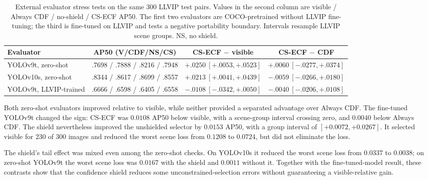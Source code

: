 \documentclass[preprint,11pt]{elsarticle}
\begin{document}
\begin{table}[t]
\centering
\scriptsize
\setlength{\tabcolsep}{3pt}
\caption{External evaluator stress tests on the same 300 LLVIP test pairs.
Values in the second column are visible / Always CDF / no-shield / CS-ECF AP50.
The first two evaluators are COCO-pretrained without LLVIP fine-tuning; the
third is fine-tuned on LLVIP and tests a negative portability boundary.
Intervals resample LLVIP scene groups. NS, no shield.}
\label{tab:independent}
\begin{tabular}{@{}lccc@{}}
\toprule
Evaluator & AP50 (V/CDF/NS/CS) &
CS-ECF \(-\) visible & CS-ECF \(-\) CDF \\
\midrule
YOLOv9t, zero-shot & .7698 / .7888 / .8216 / .7948 &
\(+.0250~[+.0053,+.0523]\) & \(+.0060~[-.0277,+.0374]\) \\
YOLOv10s, zero-shot & .8344 / .8617 / .8699 / .8557 &
\(+.0213~[+.0041,+.0439]\) & \(-.0059~[-.0266,+.0180]\) \\
YOLOv9t, LLVIP-trained & .6666 / .6598 / .6405 / .6558 &
\(-.0108~[-.0342,+.0050]\) & \(-.0040~[-.0206,+.0108]\) \\
\bottomrule
\end{tabular}
\end{table}

Both zero-shot evaluators improved relative to visible, while neither provided
a separated advantage over Always CDF. The fine-tuned YOLOv9t changed the sign:
CS-ECF was \(0.0108\) AP50 below visible, with a scene-group interval crossing
zero, and \(0.0040\) below Always CDF. The shield nevertheless improved the
unshielded selector by \(0.0153\) AP50, with a group interval of
\([+0.0072,+0.0267]\). It selected visible for 230 of 300 images and reduced
the worst scene loss from \(0.1208\) to \(0.0724\), but did not eliminate the
loss.

The shield's tail effect was mixed even among the zero-shot checks. On
YOLOv10s it reduced the worst scene loss from \(0.0337\) to \(0.0038\);
on zero-shot YOLOv9t the worst scene loss was \(0.0167\) with the shield and
\(0.0011\) without it. Together with the fine-tuned-model result, these
contrasts show that the confidence shield reduces some unconstrained-selection
errors without guaranteeing a visible-relative gain.
\end{document}
